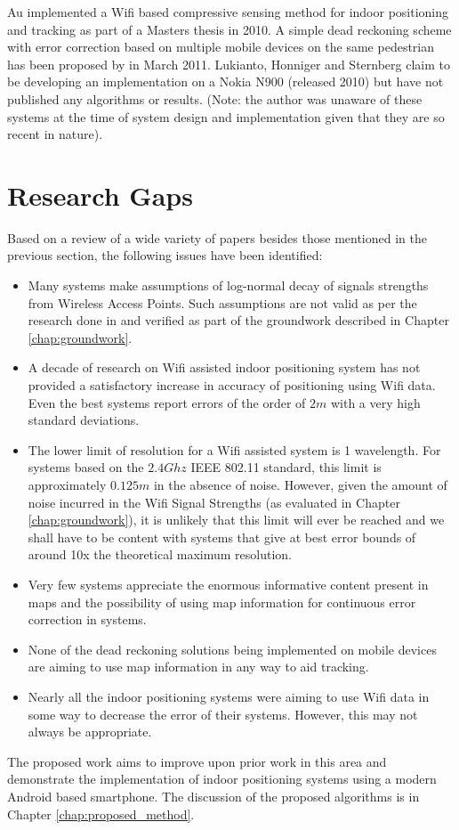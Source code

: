 Au \cite{Anthea} implemented a Wifi based compressive sensing method for indoor positioning and tracking as part of a Masters thesis in 2010. A simple dead reckoning scheme with error correction based on multiple mobile devices on the same pedestrian has been proposed by \cite{NUSJin} in March 2011. Lukianto, Honniger and Sternberg\cite{Lukianto} claim to be developing an implementation on a Nokia N900 (released 2010) but have not published any algorithms or results. (Note: the author was unaware of these systems at the time of system design and implementation given that they are so recent in nature).


\section{Research Gaps}

Based on a review of a wide variety of papers besides those mentioned in the previous section, the following issues have been identified:

\begin{itemize}
\item Many systems make assumptions of log-normal decay of signals strengths from Wireless Access Points. Such assumptions are not valid as per the research done in \cite{KStats} and verified as part of the groundwork described in Chapter \ref{chap:groundwork}.
\item A decade of research on Wifi assisted indoor positioning system has not provided a satisfactory increase in accuracy of positioning using Wifi data. Even the best systems report errors of the order of $2 m$ with a very high standard deviations.
\item The lower limit of resolution for a Wifi assisted system is 1 wavelength. For systems based on the $2.4 Ghz$ IEEE 802.11 standard, this limit is approximately $0.125 m$ in the absence of noise. However, given the amount of noise incurred in the Wifi Signal Strengths (as evaluated in Chapter \ref{chap:groundwork}), it is unlikely that this limit will ever be reached and we shall have to be content with systems that give at best error bounds of around 10x the theoretical maximum resolution.
\item Very few systems appreciate the enormous informative content present in maps and the possibility of using map information for continuous error correction in systems. 
\item None of the dead reckoning solutions being implemented on mobile devices are aiming to use map information in any way to aid tracking.
\item Nearly all the indoor positioning systems were aiming to use Wifi data in some way to decrease the error of their systems. However, this may not always be appropriate.
\end{itemize}

The proposed work aims to improve upon prior work in this area and demonstrate the implementation of indoor positioning systems using a modern Android based smartphone. The discussion of the proposed algorithms is in Chapter \ref{chap:proposed_method}.



